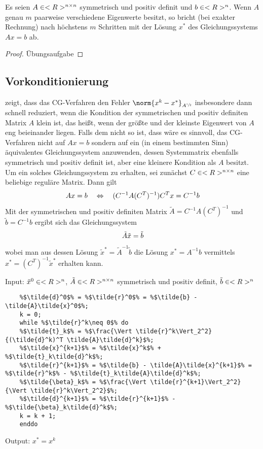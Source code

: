 \begin{proposition}
	Es seien $A\in<R>^{n \times n}$ symmetrisch und positiv definit und $b\in<R>^n$. Wenn $A$ genau $m$ paarweise verschiedene Eigenwerte besitzt, so bricht  (bei exakter Rechnung) nach höchstens $m$ Schritten mit der Lösung $x^\ast$ des Gleichungssystems $Ax=b$ ab.
\end{proposition}
\begin{proof}
	Übungsaufgabe
\end{proof}

\subsection{Vorkonditionierung}

 zeigt, dass das CG-Verfahren den Fehler $\norm{x^k-x^\ast}_{A^{\sfrac{1}{2}}}$ insbesondere dann schnell reduziert, wenn die Kondition der symmetrischen und positiv definiten Matrix $A$ klein ist, das heißt, wenn der größte und der kleinste Eigenwert von $A$ eng beieinander liegen. Falls dem nicht so ist, dass wäre es sinnvoll, das CG-Verfahren nicht auf $Ax=b$ sondern auf ein (in einem bestimmten Sinn) äquivalentes Gleichungssystem anzuwenden, dessen Systemmatrix ebenfalls symmetrisch und positiv definit ist, aber eine kleinere Kondition als $A$ besitzt. Um ein solches Gleichungssystem zu erhalten, sei zunächst $C\in<R>^{n \times n}$ eine beliebige reguläre Matrix. Dann gilt
\begin{align}
	Ax=b\quad\Leftrightarrow\quad (C^{-1}A(C^T)^{-1})C^Tx=C^{-1}b\notag
\end{align}
Mit der symmetrischen und positiv definiten Matrix $\tilde{A}=C^{-1}A(C^T)^{-1}$ und $\tilde{b}=C^{-1}b$ ergibt sich das Gleichungssystem 
\begin{align}
	\tilde{A}\tilde{x}=\tilde{b}\notag
\end{align}
wobei man aus dessen Lösung $\tilde{x}^\ast=\tilde{A}^{-1}\tilde{b}$ die Lösung $x^\ast=A^{-1}b$ vermittels $x^\ast=(C^T)^{-1}\tilde{x}^\ast$ erhalten kann.

\begin{algorithm}[CG-Verfahren für $\tilde{A}\tilde{x}=\tilde{b}$]
	Input: $\tilde{x}^0\in<R>^n$, $\tilde{A}\in<R>^{n \times n}$ symmetrisch und positiv definit, $\tilde{b}\in<R>^n$
	\begin{lstlisting}
	%$\tilde{d}^0$% = %$\tilde{r}^0$% = %$\tilde{b} - \tilde{A}\tilde{x}^0$%;
	k = 0;
	while %$\tilde{r}^k\neq 0$% do
	%$\tilde{t}_k$% = %$\frac{\Vert \tilde{r}^k\Vert_2^2}{(\tilde{d}^k)^T \tilde{A}\tilde{d}^k}$%;
	%$\tilde{x}^{k+1}$% = %$\tilde{x}^k$% + %$\tilde{t}_k\tilde{d}^k$%;
	%$\tilde{r}^{k+1}$% = %$\tilde{b} - \tilde{A}\tilde{x}^{k+1}$% = %$\tilde{r}^k$% - %$\tilde{t}_k\tilde{A}\tilde{d}^k$%;
	%$\tilde{\beta}_k$% = %$\frac{\Vert \tilde{r}^{k+1}\Vert_2^2}{\Vert \tilde{r}^k\Vert_2^2}$%;
	%$\tilde{d}^{k+1}$% = %$\tilde{r}^{k+1}$% - %$\tilde{\beta}_k\tilde{d}^k$%;
	k = k + 1;
	enddo
	\end{lstlisting}
	Output: $x^\ast=x^k$
\end{algorithm}

